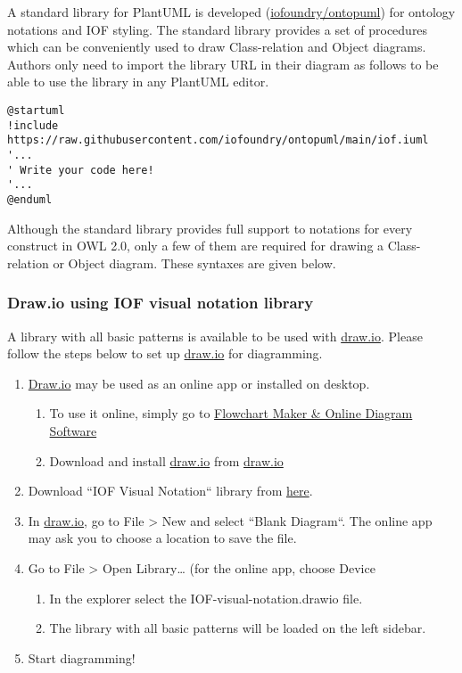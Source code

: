 A standard library for PlantUML is developed (\href{https://github.com/iofoundry/ontopuml}{iofoundry/ontopuml}) for ontology notations and IOF styling. The standard library provides a set of procedures which can be conveniently used to draw Class-relation and Object diagrams. Authors only need to import the library URL in their diagram as follows to be able to use the library in any PlantUML editor.  

\begin{verbatim}
@startuml
!include https://raw.githubusercontent.com/iofoundry/ontopuml/main/iof.iuml
'...
' Write your code here!
'...
@enduml
\end{verbatim}
Although the standard library provides full support to notations for every construct in OWL 2.0, only a few of them are required for drawing a Class-relation or Object diagram. These syntaxes are given below. 



\subsubsection{Draw.io using IOF visual notation library}

A library with all basic patterns is available to be used with \href{http://draw.io/}{draw.io}. Please follow the steps below to set up \href{http://draw.io/}{draw.io} for diagramming.

\begin{enumerate}
    \item \href{http://draw.io/}{Draw.io} may be used as an online app or installed on desktop. 
    \begin{enumerate}
        \item To use it online, simply go to \href{https://app.diagrams.net/}{Flowchart Maker \& Online Diagram Software} 
        \item Download and install \href{http://draw.io/}{draw.io} from \href{https://www.drawio.com/}{draw.io} 
    \end{enumerate}
    \item Download “IOF Visual Notation“ library from \href{https://github.com/iofoundry/IOF-Core-Pattern-v2/blob/main/etc/IOF-visual-notation.drawio}{here}.
    \item In \href{http://draw.io/}{draw.io}, go to File > New and select “Blank Diagram“. The online app may ask you to choose a location to save the file. 
    \item Go to File > Open Library… (for the online app, choose Device 
    \begin{enumerate}
        \item In the explorer select the IOF-visual-notation.drawio file.
        \item The library with all basic patterns will be loaded on the left sidebar.
    \end{enumerate}
    \item Start diagramming!
\end{enumerate}
 